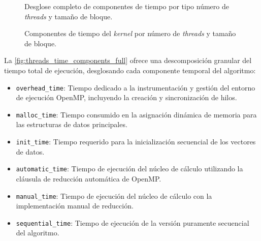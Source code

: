         \begin{figure}[H]
            \centering
            \caption{Desglose completo de componentes de tiempo por tipo número de \textit{threads} y tamaño de bloque.}
            \label{fig:threads_time_components_full}
        \end{figure}

        \begin{figure}[H]
            \centering
            \caption{Componentes de tiempo del \textit{kernel} por número de \textit{threads} y tamaño de bloque.}
            \label{fig:threads_time_components_kernel}
        \end{figure}

        La \autoref{fig:threads_time_components_full} ofrece una descomposición granular del tiempo total de ejecución, desglosando cada componente temporal del algoritmo:
        
        \begin{itemize}
        
            \item \texttt{overhead\_time}: Tiempo dedicado a la instrumentación y gestión del entorno de ejecución OpenMP, incluyendo la creación y sincronización de hilos.
            
            \item \texttt{malloc\_time}: Tiempo consumido en la asignación dinámica de memoria para las estructuras de datos principales.
            
            \item \texttt{init\_time}: Tiempo requerido para la inicialización secuencial de los vectores de datos.
            
            \item \texttt{automatic\_time}: Tiempo de ejecución del núcleo de cálculo utilizando la cláusula de reducción automática de OpenMP.
            
            \item \texttt{manual\_time}: Tiempo de ejecución del núcleo de cálculo con la implementación manual de reducción.
            
            \item \texttt{sequential\_time}: Tiempo de ejecución de la versión puramente secuencial del algoritmo.
            
        \end{itemize}
    
